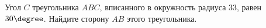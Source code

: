 \begin{ex}
	\begin{condition}
		Угол \( C  \) треугольника \( ABC \), вписанного в окружность радиуса 33, равен \( 30  \degree\). Найдите сторону \( AB  \) этого треугольника.
	\end{condition}
\end{ex}